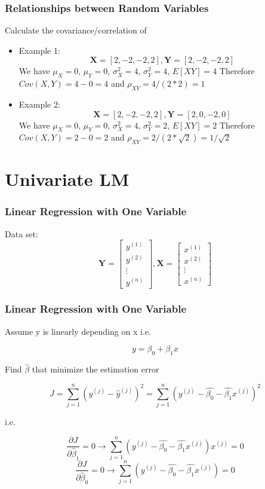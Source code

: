 \documentclass[notheorems, aspectratio=54]{beamer}
\begin{document}
\begin{frame}
\frametitle{Relationships between Random Variables}
Calculate the covariance/correlation of 
\begin{itemize}
\item Example 1:$$\textbf{X}=[2, -2, -2, 2], \textbf{Y}=[2, -2, -2, 2]$$
We have
$\mu_X=0$, $\mu_Y=0$, $\sigma_X^2=4$, $\sigma_Y^2=4$, $E[XY]=4$
Therefore $Cov(X, Y)=4-0=4$ and $\rho_{XY}=4/(2*2)=1$

\item Example 2: $$\textbf{X}=[2, -2, -2, 2], \textbf{Y}=[2, 0, -2, 0]$$
We have
$\mu_X=0$, $\mu_Y=0$, $\sigma_X^2=4$, $\sigma_Y^2=2$, $E[XY]=2$
Therefore $Cov(X, Y)=2-0=2$ and $\rho_{XY}=2/(2*\sqrt{2})=1/\sqrt{2}$
\end{itemize}



\end{frame}

\section{Univariate LM}

\begin{frame}

\frametitle{Linear Regression with One Variable}
Data set:
$$
\textbf{Y}=
\begin{bmatrix}
    y^{(1)}\\
    y^{(2)}\\
	\vdots\\
    y^{(n)}
\end{bmatrix}
,
\textbf{X}=
\begin{bmatrix}
    x^{(1)}\\
    x^{(2)}\\
	\vdots\\
    x^{(n)}
\end{bmatrix}
$$
\end{frame}

\begin{frame}
\frametitle{Linear Regression with One Variable}
Assume y is linearly depending on x i.e.

$$
y = \beta_0 + \beta_1 x
$$

Find $\hat{\beta}$ that minimize the estimation error

$$
J=\sum\limits_{j=1}^{n}(y^{(j)}-\hat{y}^{(j)})^2 = \sum\limits_{j=1}^{n} (y^{(j)}-\hat{\beta_0}-\hat{\beta_1} x^{(j)})^2
$$

i.e.

$$
\frac{\partial J}{\partial \hat{\beta}_1}=0
\rightarrow
\sum\limits_{j=1}^{n}(y^{(j)}-\hat{\beta_0}-\hat{\beta_1} x^{(j)})x^{(j)}=0
$$
$$
\frac{\partial J}{\partial \hat{\beta}_0}=0
\rightarrow
\sum\limits_{j=1}^{n}(y^{(j)}-\hat{\beta_0}-\hat{\beta_1} x^{(j)})=0
$$

\end{frame}
\end{document}
